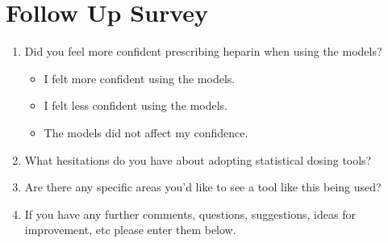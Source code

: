 \documentclass[12pt,a4paper,]{report}
\providecommand{\tightlist}{%
  \setlength{\itemsep}{0pt}\setlength{\parskip}{0pt}}
\begin{document}
\section{Follow Up Survey}\label{follow-up-survey}

\begin{enumerate}
\def\labelenumi{\arabic{enumi}.}
\tightlist
\item
  Did you feel more confident prescribing heparin when using the models?

  \begin{itemize}
  \tightlist
  \item
    I felt more confident using the models.\\
  \item
    I felt less confident using the models.
  \item
    The models did not affect my confidence.
  \end{itemize}
\item
  What hesitations do you have about adopting statistical dosing
  tools?\\
\item
  Are there any specific areas you'd like to see a tool like this being
  used?\\
\item
  If you have any further comments, questions, suggestions, ideas for
  improvement, etc please enter them below.
\end{enumerate}
\end{document}
